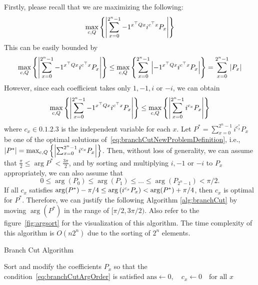 \documentclass[a4paper, onecolumn, 11pt, longbibliography]{quantumarticle}
\begin{document}
Firstly, please recall that we are maximizing the following:
\begin{equation*}
  \max_{c,Q} \qty{ \abs{\sum_{x=0}^{2^n-1} -1^{x^\top Q x} i^{c^\top x} P_x} }
\end{equation*}
This can be easily bounded by
\begin{equation*}
  \max_{c,Q} \qty{ \abs{\sum_{x=0}^{2^n-1} -1^{x^\top Q x} i^{c^\top x} P_x} }
  \leq \max_{c,Q} \qty{ \sum_{x=0}^{2^n-1} \abs{-1^{x^\top Q x} i^{c^\top x} P_x} }
  = \sum_{x=0}^{2^n-1} \abs{P_x}
\end{equation*}
However, since each coefficient takes only $1, -1, i$ or $-i$,
we can obtain
\begin{equation}\label{eq:branchCutNewProblemDefinition}
  \max_{c,Q} \qty{ \abs{\sum_{x=0}^{2^n-1} -1^{x^\top Q x} i^{c^\top x} P_x} }
  \leq \max_{c,Q} \qty{ \abs{\sum_{x=0}^{2^n-1} i^{c_x} P_x} }
\end{equation}
where $c_x \in \qty{0, 1, 2, 3}$ is the independent variable for each $x$.
Let $P^* = \sum_{x=0}^{2^n-1} i^{c_x^*} P_x$ be
one of the optimal solutions of~\eqref{eq:branchCutNewProblemDefinition},
i.e., $\abs{P^*} = \max_{c,Q} \qty{ \abs{\sum_{x=0}^{2^n-1} i^{c_x} P_x} }$.
Then, without loss of generality,
we can assume that $\frac{\pi}{2} \leq \arg P^* < \frac{3\pi}{2}$,
and by sorting and multiplying $i,-1$ or $-i$ to $P_x$ appropriately,
we can also assume that
\begin{equation}\label{eq:branchCutArgOrder}
  0 \leq \arg(P_0) \leq \arg(P_1) \leq \dots \leq \arg(P_{2^n-1}) < \pi/2.
\end{equation}
If all $c_x$ satisfies $\arg(P^*) - \pi/4 \leq \arg\qty(i^{c_x} P_x) < \arg(P^*) + \pi/4$,
then $c_x$ is optimal for $P^*$.
Therefore, we can justify the following Algorithm \ref{alg:branchCut}
by moving $\arg(P^*)$ in the range of $[\pi/2, 3\pi/2)$.
Also refer to the figure~\ref{fig:argsort} for the visualization of this algorithm.
The time complexity of this algorithm is $O(n2^n)$
due to the sorting of $2^n$ elements.

\begin{algorithm}
  \caption{Branch Cut Algorithm}
  \label{alg:branchCut}
  Sort and modify the coefficients $P_x$ so that the condition~\eqref{eq:branchCutArgOrder} is satisfied\;
  $\mathrm{ans} \leftarrow 0, \quad c_x \leftarrow 0 \quad \text{for all } x$\;
\end{algorithm}
\end{document}

